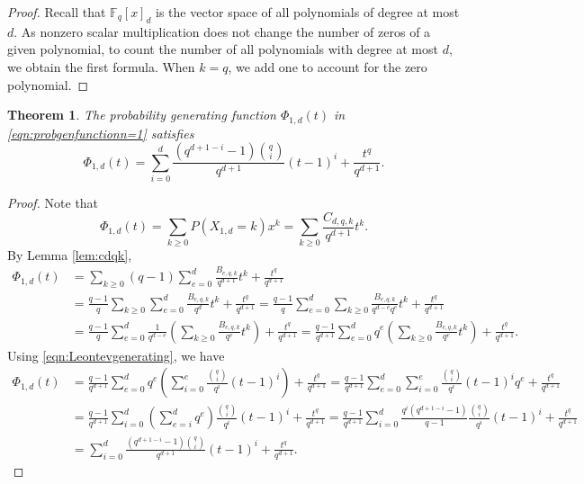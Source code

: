 \documentclass[12pt]{amsart}
\newtheorem{theorem}{Theorem}[section]
\theoremstyle{definition}
\newcommand{\FF}{\mathbb{F} }
\begin{document}
\begin{proof}
Recall that $\FF_q[x]_d$ is the vector space of all polynomials of degree at most $d$. As nonzero scalar multiplication does not change the number of zeros of a given polynomial, to count the number of all polynomials with degree at most $d$, we obtain the first formula. When $k = q$, we add one to account for the zero polynomial.
\end{proof}

\begin{theorem}\label{thm:pgf}
The probability generating function $\Phi_{1,d}(t)$ in \eqref{eqn:probgenfunctionn=1} satisfies
\begin{equation}\label{eqn:pgnn=1}
    \Phi_{1,d}(t) = \sum_{i=0}^d \frac{(q^{d+1-i}-1){q \choose i}}{q^{d+1}}(t-1)^i + \frac{t^q}{q^{d+1}}.
\end{equation}
\end{theorem}

\begin{proof}
Note that 
\[
    \Phi_{1,d}(t) = \sum_{k \ge 0}P(X_{1,d} = k)x^k = \sum_{k \ge 0}\frac{C_{d,q,k}}{q^{d+1}}t^k.
\]
By Lemma \ref{lem:cdqk}, 
\begin{equation}
\begin{split}
    \Phi_{1,d}(t) &= 
    \sum_{k \ge 0}(q-1)\sum_{e=0}^{d}\frac{B_{e,q,k}}{q^{d+1}}t^k + \frac{t^q}{q^{d+1}} \\
    &= \frac{q-1}{q}\sum_{k \ge 0}\sum_{e=0}^{d}\frac{B_{e,q,k}}{q^d}t^k + \frac{t^q}{q^{d+1}} = \frac{q-1}{q}\sum_{e=0}^{d}\sum_{k \ge 0}\frac{B_{e,q,k}}{q^{d-e}q^e}t^k + \frac{t^q}{q^{d+1}} \\
    &= \frac{q-1}{q}\sum_{e=0}^{d}\frac{1}{q^{d-e}}\left(\sum_{k \ge 0}\frac{B_{e,q,k}}{q^e}t^k\right) + \frac{t^q}{q^{d+1}}
    = \frac{q-1}{q^{d+1}}\sum_{e=0}^{d}q^{e}\left(\sum_{k \ge 0}\frac{B_{e,q,k}}{q^e}t^k\right) + \frac{t^q}{q^{d+1}}.
\end{split}
\end{equation}
Using \eqref{eqn:Leontevgenerating}, we have
\begin{equation*}
\begin{split}
    \Phi_{1,d}(t) &= \frac{q-1}{q^{d+1}}\sum_{e=0}^{d}q^e\left(\sum_{i=0}^e\frac{{q \choose i}}{q^i}(t-1)^i\right) + \frac{t^q}{q^{d+1}}
    = \frac{q-1}{q^{d+1}}\sum_{e=0}^{d}\sum_{i=0}^{e}\frac{\binom{q}{i}}{q^i}(t-1)^i q^e + \frac{t^q}{q^{d+1}} \\
    &= \frac{q-1}{q^{d+1}}\sum_{i=0}^{d}\left(\sum_{e=i}^{d}q^e\right)\frac{\binom{q}{i}}{q^i}(t-1)^i + \frac{t^q}{q^{d+1}}
    = \frac{q-1}{q^{d+1}}\sum_{i=0}^{d}\frac{q^i (q^{d+1-i}-1)}{q-1}\frac{\binom{q}{i}}{q^i}(t-1)^i + \frac{t^q}{q^{d+1}} \\
    &= \sum_{i=0}^d \frac{(q^{d+1-i}-1){q \choose i}}{q^{d+1}}(t-1)^i + \frac{t^q}{q^{d+1}}.
\end{split}
\end{equation*}
\end{proof}
\end{document}
